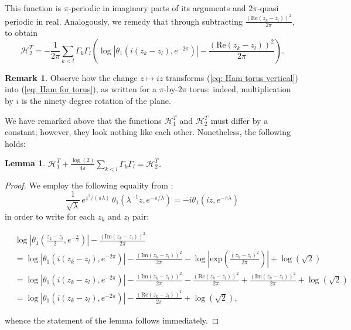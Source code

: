 \documentclass[11pt,twoside]{article}
\newtheorem{lem}[theorem]{Lemma}
\theoremstyle{definition}
\newtheorem{rem}[theorem]{Remark}
\numberwithin{equation}{section}
\begin{document}
This function is $\pi$-periodic in imaginary parts of its arguments and $2\pi$-quasi periodic in real. Analogously, we remedy that through subtracting $\frac{\left(\mathrm{Re}(z_k-z_l)\right)^2}{2\pi}$, to obtain
\begin{equation}
    \label{eq: Ham torus vertical}
    \mathcal{H}^T_2=  -\frac{1}{2\pi}\sum_{k<l}\Gamma_k\Gamma_l\left(\log\left|\theta_1\left(i\left(z_k-z_l\right),e^{-2\pi}\right)\right| - \frac{\left(\mathrm{Re}(z_k-z_l)\right)^2}{2\pi}\right).
\end{equation}
\begin{rem}
 Observe how the change $z\mapsto iz$ transforms (\ref{eq: Ham torus vertical}) into (\ref{eq: Ham for torus}), as written for a $\pi$-by-$2\pi$ torus: indeed, multiplication by $i$ is the ninety degree rotation of the plane.
\end{rem}
We have remarked above that the functions $\mathcal{H}^T_1$ and $\mathcal{H}^T_2$ must differ by a constant; however, they look nothing like each other. Nonetheless, the following holds:

\begin{lem}
$\mathcal{H}_1^T + \frac{\log(2)}{4\pi}\sum\limits_{k<l}\Gamma_k\Gamma_l  = \mathcal{H}_2^T$.
\end{lem}
\begin{proof}
We employ the following  equality from \cite{bonn}:
\begin{equation}
\label{eq: connection with i}
\frac{1}{\sqrt{\lambda}}\,e^{z^2/(\pi\lambda)}\,\theta_1\left(\lambda^{-1}z, e^{-{\pi}/{\lambda}}\right)= -i\theta_1\left(iz, e^{-\pi\lambda}\right)
\end{equation}
in order to write for each $z_k$ and $z_l$ pair:
\begin{small}
\begin{equation*}
    \begin{split}
     & \log\left|\theta_1\left(\frac{z_k-z_l}{2},e^{-\frac{\pi}{2}}\right)\right|   - \frac{(\mathrm{Im}(z_k-z_l))^2}{2\pi} \\&=\log\left|\theta_1\left(i(z_k-z_l),e^{-2\pi}\right)\right|   - \frac{(\mathrm{Im}(z_k-z_l))^2}{2\pi}- \log\left|\mathrm{exp}\left(\frac{(z_k-z_l)^2}{2\pi}\right)\right| + \log(\sqrt{2}) \\&=\log\left|\theta_1\left(i(z_k-z_l),e^{-2\pi}\right)\right|   - \frac{(\mathrm{Im}(z_k-z_l))^2}{2\pi} - \frac{(\mathrm{Re}(z_k-z_l))^2}{2\pi} + \frac{(\mathrm{Im}(z_k-z_l))^2}{2\pi} + \log(\sqrt{2})\\&=\log\left|\theta_1\left(i(z_k-z_l),e^{-2\pi}\right)\right|  - \frac{(\mathrm{Re}(z_k-z_l))^2}{2\pi} + \log(\sqrt{2}),
    \end{split}
\end{equation*}
\end{small}
whence the statement of the lemma follows immediately.
\end{proof}
\end{document}
